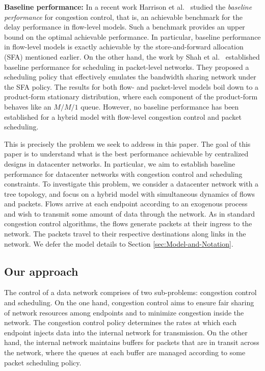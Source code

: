 \documentclass[ssy,preprint]{imsart_axv}
\numberwithin{equation}{section}
\theoremstyle{plain}
\theoremstyle{definition}
\theoremstyle{remark}
\theoremstyle{plain}
\theoremstyle{plain}
\begin{document}
\medskip
\noindent\textbf{Baseline performance:} In a recent work Harrison et al.~\cite{harrison2014bandwidth} studied the \emph{baseline performance} for congestion control, that is, an achievable benchmark for the delay performance in flow-level models. Such a benchmark provides an upper bound on the optimal achievable performance. In particular, baseline performance in flow-level models is exactly achievable by the store-and-forward allocation (SFA) mentioned earlier. On the other hand, the work by Shah et al.~\cite{shah2014SFA} established baseline performance for scheduling in packet-level networks. They proposed a scheduling policy that effectively emulates the bandwidth sharing network under the SFA policy. The results for both flow- and packet-level models boil down to a product-form stationary distribution, where each component of the product-form behaves like an $M/M/1$ queue. However, no baseline performance has been established for a hybrid model with flow-level congestion control and packet scheduling. 

\smallskip


	
This is precisely the problem we seek to address in this paper.
The goal of this paper is to understand what is the best performance achievable by centralized designs in datacenter networks. In particular, we aim to establish baseline performance for datacenter networks with congestion control and scheduling constraints. 
To investigate this problem, we consider a datacenter network with a tree topology, and focus on a hybrid model with simultaneous dynamics of flows and packets. Flows arrive at each endpoint according to an exogenous process and wish to transmit some amount of data through the network. As in standard congestion control algorithms, the flows generate packets at their ingress to the network. The packets travel to their respective destinations along links in the network. We defer the model details to Section \ref{sec:Model-and-Notation}.




\subsection{Our approach}




The control of a data network comprises of two sub-problems: congestion control and scheduling. 
On the one hand, congestion control aims to ensure fair sharing of network resources among endpoints and to minimize congestion inside the network. The congestion control policy determines the rates at which each endpoint injects data into the internal network for transmission. On the other hand, the internal network maintains buffers for packets that are in transit across the network, where the queues at each buffer are managed according to some packet scheduling policy. 
\end{document}
